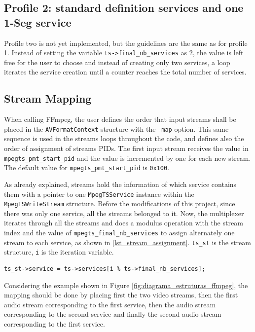 \documentclass[
	12pt,				%
	openright,			%
	twoside,			%
	a4paper,			%
	brazil,
	french,				%
	english
	]{abntex2}
\begin{document}
\subsection{Profile 2: standard definition services and one 1-Seg service}

Profile two is not yet implemented, but the guidelines are the same as for profile 1. Instead of setting the variable \texttt{ts->final\_nb\_services} as 2, the value is left free for the user to choose and instead of creating only two services, a loop iterates the service creation until a counter reaches the total number of services.

\subsection{Stream Mapping}

When calling FFmpeg, the user defines the order that input streams shall be placed in the \texttt{AVFormatContext} structure with the \texttt{-map} option. This same sequence is used in the streams loops throughout the code, and defines also the order of assignment of streams PIDs. The first input stream receives the value in \texttt{mpegts\_pmt\_start\_pid} and the value is incremented by one for each new stream. The default value for \texttt{mpegts\_pmt\_start\_pid} is \texttt{0x100}.

As already explained, streams hold the information of which service contains them with a pointer to one \texttt{MpegTSService} instance within the \texttt{MpegTSWriteStream} structure. Before the modifications of this project, since there was only one service, all the streams belonged to it. Now, the multiplexer iterates through all the streams and does a modulus operation with the stream index and the value of \texttt{mpegts\_final\_nb\_services} to assign alternately one stream to each service, as shown in \autoref{lst_stream_assignment}. \texttt{ts\_st} is the stream structure, \texttt{i} is the iteration variable.

\begin{lstlisting}[caption={Assigning streams to services.}, label={lst_stream_assignment}]
ts_st->service = ts->services[i % ts->final_nb_services];
\end{lstlisting}

Considering the example shown in Figure \ref{fig:diagrama_estruturas_ffmpeg}, the mapping should be done by placing first the two video streams, then the first audio stream corresponding to the first service, then the audio stream corresponding to the second service and finally the second audio stream corresponding to the first service.
\end{document}
